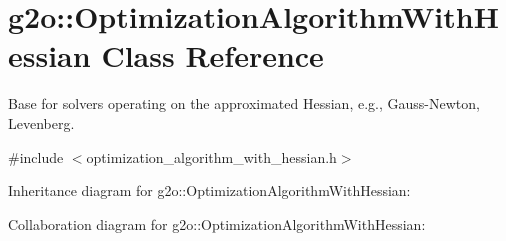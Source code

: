 \hypertarget{classg2o_1_1OptimizationAlgorithmWithHessian}{}\section{g2o\+:\+:Optimization\+Algorithm\+With\+Hessian Class Reference}
\label{classg2o_1_1OptimizationAlgorithmWithHessian}


Base for solvers operating on the approximated Hessian, e.\+g., Gauss-\/\+Newton, Levenberg.  




{\ttfamily \#include $<$optimization\+\_\+algorithm\+\_\+with\+\_\+hessian.\+h$>$}



Inheritance diagram for g2o\+:\+:Optimization\+Algorithm\+With\+Hessian\+:


Collaboration diagram for g2o\+:\+:Optimization\+Algorithm\+With\+Hessian\+:
